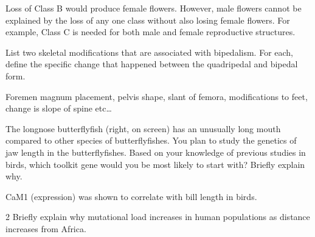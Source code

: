 \documentclass[12pt, addpoints]{exam}
\newcommand*\Matching[1]{
\ifprintanswers
	\textbf{#1}
\else
	\rule{2.1in}{0.5pt}
\fi
}
\newlength\matchlena
\newlength\matchlenb
\newcommand\MatchQuestion[2]{%
	\addtocounter{numpoints}{2}
	\setlength\matchlenb{\linewidth}
	\addtolength\matchlenb{-\matchlena}
	\parbox[t]{\matchlena}{\Matching{#1}}\enspace\parbox[t]{\matchlenb}{#2}}
\newcommand*\AnswerBox[2]{%
    \parbox[t][#1]{0.92\linewidth}{%
    \begin{solution}#2\end{solution}}
    \vspace*{\stretch{1}}
}
\begin{document}
\begin{questions}
\AnswerBox{0.3\textheight}{%
	Loss of Class B would produce female flowers. However, male flowers cannot be explained by the loss of any one class without also losing female flowers. For example, Class C is needed for both male and female reproductive structures.
	}




%



\question[5]
List two skeletal modifications that are associated with bipedalism. For each, define the specific change that happened between the quadripedal and bipedal form.

\AnswerBox{0.1\textheight}{Foremen magnum placement, pelvis shape, slant of femora, modifications to feet, change is slope of spine etc…}

\newpage

\question[5]
The longnose butterflyfish (right, on screen) has an unusually long mouth compared to other species of butterflyfishes. You plan to study the genetics of jaw length in the butterflyfishes.  Based on your knowledge of previous studies in birds, which toolkit gene would you be most likely to start with? Briefly explain why.
	
	\AnswerBox{0.3\textheight}{CaM1 (expression) was shown to correlate with bill length in birds.}


\question[5]
\begin{multicols}{2}
	Briefly explain why mutational load increases in human populations as distance increases from Africa.
	

\end{multicols}
\end{questions}
\end{document}
